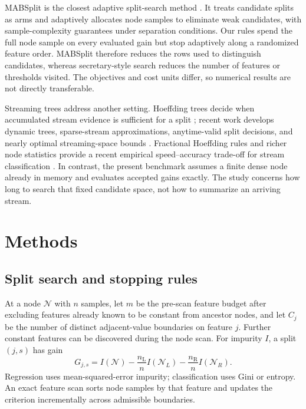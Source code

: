 \documentclass[final,5p,times,twocolumn]{elsarticle}
\newcommand{\node}{\mathcal{N}}
\newcommand{\Imp}{I}
\newcommand{\gain}{G}
\newcommand{\nL}{n_{\mathrm L}}
\newcommand{\nR}{n_{\mathrm R}}
\begin{document}
MABSplit is the closest adaptive split-search method \cite{tiwari2022mabsplit}. It treats candidate splits as arms and adaptively allocates node samples to eliminate weak candidates, with sample-complexity guarantees under separation conditions. Our rules spend the full node sample on every evaluated gain but stop adaptively along a randomized feature order. MABSplit therefore reduces the rows used to distinguish candidates, whereas secretary-style search reduces the number of features or thresholds visited. The objectives and cost units differ, so numerical results are not directly transferable.

Streaming trees address another setting. Hoeffding trees decide when accumulated stream evidence is sufficient for a split \cite{domingos2000vfdt}; recent work develops dynamic trees, sparse-stream approximations, anytime-valid split decisions, and nearly optimal streaming-space bounds \cite{bressan2024dynamic,pham2025streams,tatti2025approximating,iamoukou2026anytime,ta2026streamsplits}. Fractional Hoeffding rules and richer node statistics provide a recent empirical speed--accuracy trade-off for stream classification \cite{jaworski2027hoeffding}. In contrast, the present benchmark assumes a finite dense node already in memory and evaluates accepted gains exactly. The study concerns how long to search that fixed candidate space, not how to summarize an arriving stream.

\section{Methods}
\label{sec:methods}

\subsection{Split search and stopping rules}

At a node \(\node\) with \(n\) samples, let \(m\) be the pre-scan feature budget after excluding features already known to be constant from ancestor nodes, and let \(C_j\) be the number of distinct adjacent-value boundaries on feature \(j\). Further constant features can be discovered during the node scan. For impurity \(\Imp\), a split \((j,s)\) has gain
\begin{equation}
\gain_{j,s}=\Imp(\node)-\frac{\nL}{n}\Imp(\node_L)
-\frac{\nR}{n}\Imp(\node_R).
\label{eq:gain}
\end{equation}
Regression uses mean-squared-error impurity; classification uses Gini or entropy. An exact feature scan sorts node samples by that feature and updates the criterion incrementally across admissible boundaries.
\end{document}
